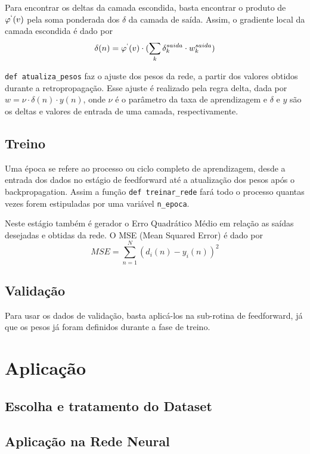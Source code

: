 \documentclass[12pt,a4paper]{article}
\begin{document}
\qquad Para encontrar os deltas da camada escondida, basta encontrar o produto de $\varphi^{`}(v)$ pela soma ponderada dos $\delta$ da camada de saída. Assim, o gradiente local da camada escondida é dado por
$$\delta(n) =\varphi^{`}(v) \cdot (\sum_k \delta_{k}^{saida}\cdot w_{k}^{saida})$$

\qquad \verb|def atualiza_pesos| faz o ajuste dos pesos da rede, a partir dos valores obtidos durante a retropropagação. Esse ajuste é realizado pela regra delta, dada por $w = \nu \cdot \delta (n) \cdot y(n)$, onde $\nu$ é o parâmetro da taxa de aprendizagem e $\delta$ e $y$ são os deltas e valores de entrada de uma camada, respectivamente.\\

\subsection{Treino}

\qquad Uma época se refere ao processo ou ciclo completo de aprendizagem, desde a entrada dos dados no estágio de feedforward até a atualização dos pesos após o backpropagation. Assim a função \verb|def treinar_rede| fará todo o processo quantas vezes forem estipuladas por uma variável \verb|n_epoca|.

\qquad Neste estágio também é gerador o Erro Quadrático Médio em relação as saídas desejadas e obtidas da rede. O MSE (Mean Squared Error) é dado por
$$MSE = \sum_{n=1}^{N}(d_i(n)-y_i(n))^2$$

\subsection{Validação}

	Para usar os dados de validação, basta aplicá-los na sub-rotina de feedforward, já que os pesos já foram definidos durante a fase de treino.

\section{Aplicação}
\subsection{Escolha e tratamento do Dataset}
\subsection{Aplicação na Rede Neural}
\end{document}
